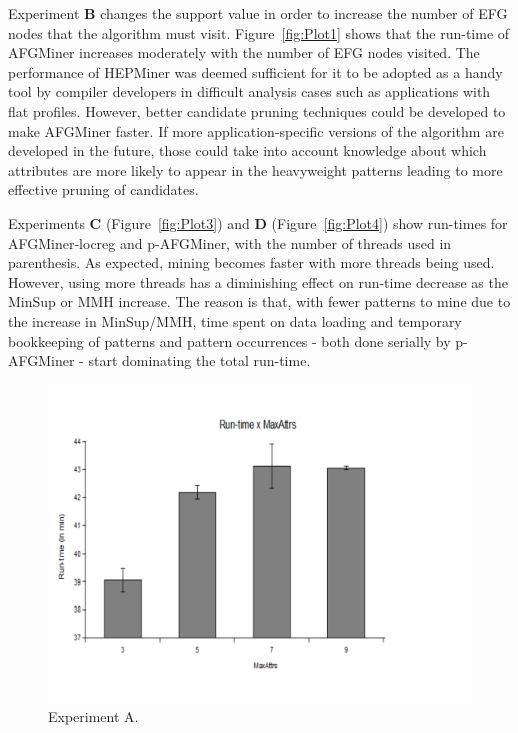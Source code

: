 Experiment {\bf B} changes the support value in order to increase the number of EFG nodes that the algorithm must visit. Figure~\ref{fig:Plot1} shows that the run-time of AFGMiner increases moderately with the number of EFG nodes visited. The performance of HEPMiner was deemed sufficient for it to be adopted as a handy tool by compiler developers in difficult analysis cases such as applications with flat profiles. However, better candidate pruning techniques could be developed to make AFGMiner faster. If more application-specific versions of the algorithm are developed in the future, those could take into account knowledge about which attributes are more likely to appear in the heavyweight patterns leading to more effective pruning of candidates.

Experiments {\bf C} (Figure~\ref{fig:Plot3}) and {\bf D} (Figure~\ref{fig:Plot4}) show run-times for AFGMiner-locreg and p-AFGMiner, with the number of threads used in parenthesis. As expected, mining becomes faster with more threads being used. However, using more threads has a diminishing effect on run-time decrease as the MinSup or MMH increase. The reason is that, with fewer patterns to mine due to the increase in MinSup/MMH, time spent on data loading and temporary bookkeeping of patterns and pattern occurrences - both done serially by p-AFGMiner - start dominating the total run-time. 

\begin{figure}[h!]
\centering
    \includegraphics[scale=0.4]{figures/plot2.pdf}
    \caption{Experiment A.}
    \label{fig:Plot2}  
\end{figure}

